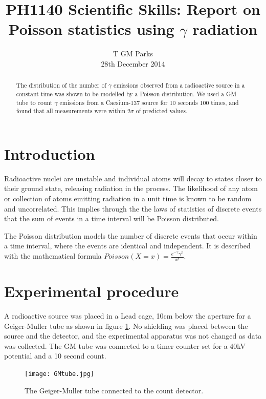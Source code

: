 \documentclass[10pt]{iopart}
\begin{document}
\title[PH1140 Report - T GM Parks]{PH1140 Scientific Skills: Report on Poisson statistics using $\gamma$ radiation}

\author{T GM Parks\\28th December 2014}

\begin{abstract}
The distribution of the number of $\gamma$ emissions observed from a radioactive source in a constant time was shown to be modelled by a Poisson distribution. We used a GM tube to count $\gamma$ emissions from a Caesium-137 source for 10 seconds 100 times, and found that all measurements were within $2\sigma$ of predicted values.
\end{abstract}


\section{Introduction}

Radioactive nuclei are unstable and individual atoms will decay to states closer to their ground state, releasing radiation in the process. The likelihood of any atom or collection of atoms emitting radiation in a unit time is known to be random and uncorrelated. This implies through the the laws of statistics of discrete events that the sum of events in a time interval will be  Poisson distributed.

The Poisson distribution models the number of discrete events that occur within a time interval, where the events are identical and independent\cite{mathworld}. It is described with the mathematical formula $Poisson(X = x) = \frac{e^{-\gamma }\gamma ^{x}}{x!}$\cite{riley}.

\section{Experimental procedure}

A radioactive source was placed in a Lead cage, 10cm below the aperture for a Geiger-Muller tube as shown in figure \ref{GMtube}. No shielding was placed between the source and the detector, and the experimental apparatus was not changed as data was collected. The GM tube was connected to a timer counter set for a 40kV potential and a 10 second count.
\begin{figure}[htbp]
\begin{center}
\texttt{[image: GMtube.jpg]}
\caption{The Geiger-Muller tube connected to the count detector.}
\label{GMtube}
\end{center}
\end{figure}
\end{document}
